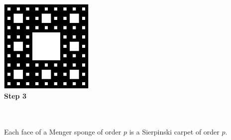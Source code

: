 \begin{minipage}{4.5cm}
\begin{center}
 \includegraphics[width=4.5cm]{pics/carpet3.png}\\
\textbf{Step 3}
\end{center}
\end{minipage}\\ 
\vspace*{0.5cm}\\
Each face of a Menger sponge of order $p$ is a Sierpinski carpet of order $p$.
